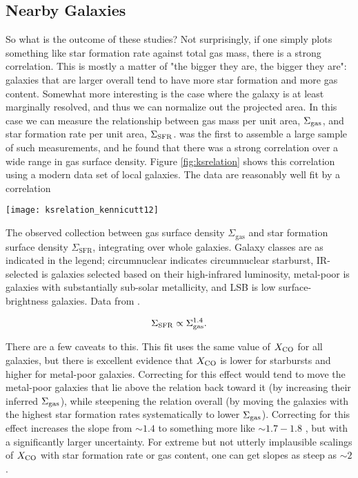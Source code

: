 \subsection{Nearby Galaxies}

So what is the outcome of these studies? Not surprisingly, if one simply plots something like star formation rate against total gas mass, there is a strong correlation. This is mostly a matter of "the bigger they are, the bigger they are": galaxies that are larger overall tend to have more star formation and more gas content. Somewhat more interesting is the case where the galaxy is at least marginally resolved, and thus we can normalize out the projected area. In this case we can measure the relationship between gas mass per unit area, $\Sigma_{\rm gas}$, and star formation rate per unit area, $\Sigma_{\rm SFR}$. \citet{kennicutt98a} was the first to assemble a large sample of such measurements, and he found that there was a strong correlation over a wide range in gas surface density. Figure \ref{fig:ksrelation} shows this correlation using a modern data set of local galaxies. The data are reasonably well fit by a correlation
\begin{marginfigure}
\texttt{[image: ksrelation\_kennicutt12]}
\caption[Whole-galaxy Kennicutt-Schmidt relation]{
\label{fig:ksrelation}
The observed collection between gas surface density $\Sigma_{\mathrm{gas}}$ and star formation surface density $\Sigma_{\mathrm{SFR}}$, integrating over whole galaxies. Galaxy classes are as indicated in the legend; circumnuclear indicates circumnuclear starburst, IR-selected is galaxies selected based on their high-infrared luminosity, metal-poor is galaxies with substantially sub-solar metallicity, and LSB is low surface-brightness galaxies. Data from \citet{kennicutt12a}.
}
\end{marginfigure}

\begin{equation}
\Sigma_{\rm SFR} \propto \Sigma_{\rm gas}^{1.4}.
\end{equation}

There are a few caveats to this. This fit uses the same value of $X_{\rm CO}$ for all galaxies, but there is excellent evidence that $X_{\rm CO}$ is lower for starbursts and higher for metal-poor galaxies. Correcting for this effect would tend to move the metal-poor galaxies that lie above the relation back toward it (by increasing their inferred $\Sigma_{\rm gas}$), while steepening the relation overall (by moving the galaxies with the highest star formation rates systematically to lower $\Sigma_{\rm gas}$). Correcting for this effect increases the slope from $\sim 1.4$ to something more like $\sim 1.7-1.8$ \citep[e.g.,][]{narayanan12a}, but with a significantly larger uncertainty. For extreme but not utterly implausible scalings of $X_{\rm CO}$ with star formation rate or gas content, one can get slopes as steep as $\sim 2$.

